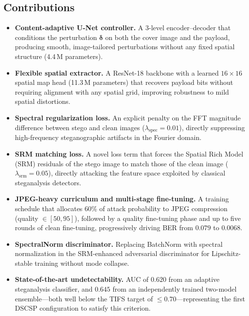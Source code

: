 \documentclass[journal]{IEEEtran}
\begin{document}
\subsection*{Contributions}
\begin{itemize}[itemsep=2pt,topsep=2pt]
    \item \textbf{Content-adaptive U-Net controller.}
          A 3-level encoder--decoder that conditions the perturbation $\bm{\delta}$ on both
          the cover image and the payload, producing smooth, image-tailored perturbations
          without any fixed spatial structure (4.4\,M parameters).

    \item \textbf{Flexible spatial extractor.}
          A ResNet-18 backbone with a learned $16\times16$ spatial map head (11.3\,M
          parameters) that recovers payload bits without requiring alignment with any spatial
          grid, improving robustness to mild spatial distortions.

    \item \textbf{Spectral regularization loss.}
          An explicit penalty on the FFT magnitude difference between stego and clean images
          ($\lambda_\text{spec}=0.01$), directly suppressing high-frequency steganographic
          artifacts in the Fourier domain.

    \item \textbf{SRM matching loss.}
          A novel loss term that forces the Spatial Rich Model (SRM) residuals of the stego
          image to match those of the clean image ($\lambda_\text{srm}=0.05$), directly
          attacking the feature space exploited by classical steganalysis detectors.

    \item \textbf{JPEG-heavy curriculum and multi-stage fine-tuning.}
          A training schedule that allocates 60\% of attack probability to JPEG compression
          (quality $\in[50,95]$), followed by a quality fine-tuning phase and up to five
          rounds of clean fine-tuning, progressively driving BER from $0.079$ to $0.0068$.

    \item \textbf{SpectralNorm discriminator.}
          Replacing BatchNorm with spectral normalization in the SRM-enhanced adversarial
          discriminator for Lipschitz-stable training without mode collapse.

    \item \textbf{State-of-the-art undetectability.}
          AUC of $0.620$ from an adaptive steganalysis classifier, and $0.645$ from an
          independently trained two-model ensemble---both well below the TIFS target of
          $\leq\!0.70$---representing the first DSCSP configuration to satisfy this criterion.
\end{itemize}
\end{document}
